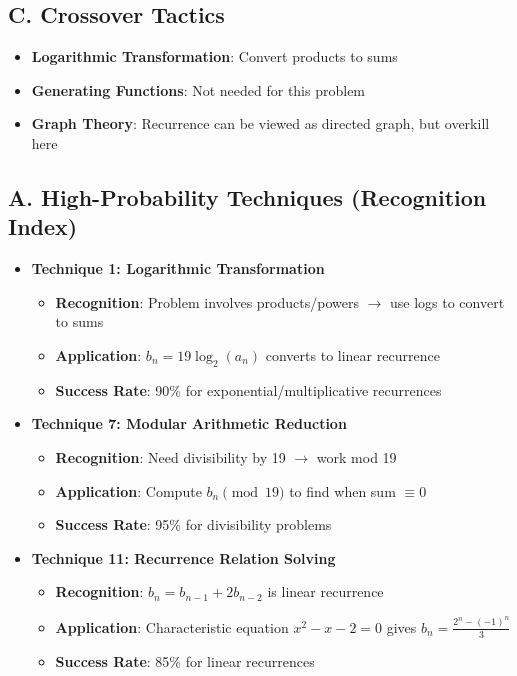 \documentclass[11pt]{article}
\begin{document}
\begin{tacticalbox}
\subsection*{C. Crossover Tactics}
\begin{itemize}[leftmargin=*]
    \item \textbf{Logarithmic Transformation}: Convert products to sums
    
    \item \textbf{Generating Functions}: Not needed for this problem
    
    \item \textbf{Graph Theory}: Recurrence can be viewed as directed graph, but overkill here
\end{itemize}
\end{tacticalbox}

\begin{conversionbox}
\subsection*{A. High-Probability Techniques (Recognition Index)}
\begin{itemize}[leftmargin=*]
    \item \textbf{Technique 1: Logarithmic Transformation}
    \begin{itemize}
        \item \textbf{Recognition}: Problem involves products/powers $\rightarrow$ use logs to convert to sums
        \item \textbf{Application}: $b_n = 19\log_2(a_n)$ converts to linear recurrence
        \item \textbf{Success Rate}: 90\% for exponential/multiplicative recurrences
    \end{itemize}
    
    \item \textbf{Technique 7: Modular Arithmetic Reduction}
    \begin{itemize}
        \item \textbf{Recognition}: Need divisibility by 19 $\rightarrow$ work mod 19
        \item \textbf{Application}: Compute $b_n \pmod{19}$ to find when sum $\equiv 0$
        \item \textbf{Success Rate}: 95\% for divisibility problems
    \end{itemize}
    
    \item \textbf{Technique 11: Recurrence Relation Solving}
    \begin{itemize}
        \item \textbf{Recognition}: $b_n = b_{n-1} + 2b_{n-2}$ is linear recurrence
        \item \textbf{Application}: Characteristic equation $x^2 - x - 2 = 0$ gives $b_n = \frac{2^n - (-1)^n}{3}$
        \item \textbf{Success Rate}: 85\% for linear recurrences
    \end{itemize}
\end{itemize}


\end{conversionbox}
\end{document}
